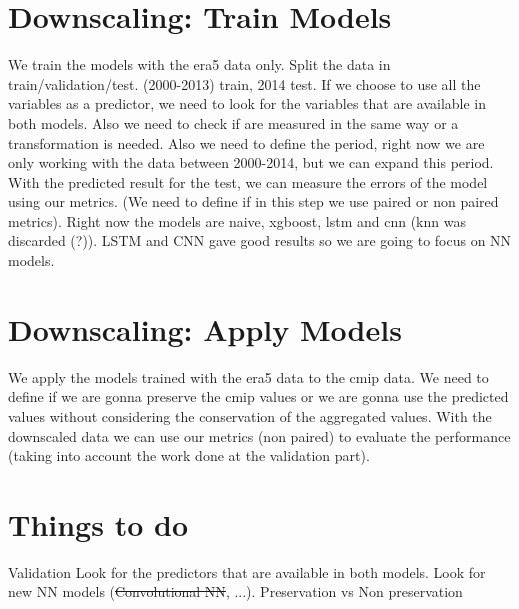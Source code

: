 \documentclass[xcolor=dvipsnames]{beamer}
\begin{document}
    \section{Downscaling: Train Models}

    \begin{frame}
        \begin{outline}
            \1 We train the models with the era5 data only. Split the data in train/validation/test. (2000-2013) train, 2014 test.            
            \1  If we choose to use all the variables as a predictor, we need to look for the variables that are available in both models. Also we need to check if are measured in the same way or a transformation is needed. Also we need to define the period, right now we are only working with the data between 2000-2014, but we can expand this period.
            \1 With the predicted result for the test, we can measure the errors of the model using our metrics. (We need to define if in this step we use paired or non paired metrics). 
            \1 Right now the models are naive, xgboost, lstm and cnn (knn was discarded (?)). LSTM and CNN gave good results so we are going to focus on NN models.
           \end{outline}
    \end{frame}

    \section{Downscaling: Apply Models}

    \begin{frame}
        \begin{outline}
            \1 We apply the models trained with the era5 data to the cmip data.
            \1 We need to define if we are gonna preserve the cmip values or we are gonna use the predicted values without considering the conservation of the aggregated values.
            \1 With the downscaled data we can use our metrics (non paired) to evaluate the performance (taking into account the work done at the validation part).
        \end{outline}
    \end{frame}

    \section{Things to do}
    \begin{frame}
        \begin{outline}
            \1 Validation
            \1 Look for the predictors that are available in both models.
            \1 Look for new NN models (\sout{Convolutional NN}, ...).
            \1 Preservation vs Non preservation
        \end{outline}
    \end{frame}
    
\end{document}

